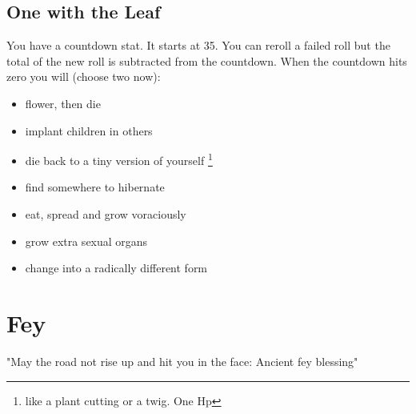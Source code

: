 \documentclass{tufte-book}
\begin{document}
\section{One with the Leaf} 
You have a countdown stat. It starts at 35. You can reroll a failed roll but the total of the new roll is subtracted from the countdown. When the countdown hits zero you will (choose two now):
\begin{itemize}
\item flower, then die
\item implant children in others
\item die back to a tiny version of yourself \footnote{like a plant cutting or a twig. One Hp}
\item find somewhere to hibernate
\item eat, spread and grow voraciously
\item grow extra sexual organs
\item change into a radically different form
\end{itemize}


\chapter{Fey}

"May the road not rise up and hit you in the face: Ancient fey blessing"

 
    
\end{document}
